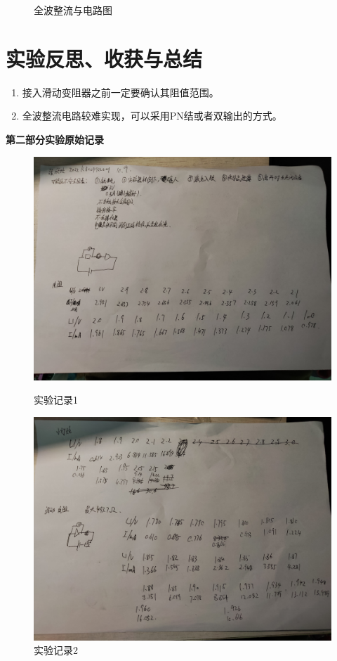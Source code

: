 \documentclass[11pt]{article}
\begin{document}
\begin{enumerate}
\begin{enumerate}
\begin{figure}[H]
            \caption{全波整流与电路图}
        \end{figure}
    \end{enumerate}
\end{enumerate}

\section{实验反思、收获与总结}
\begin{enumerate}
    \item 接入滑动变阻器之前一定要确认其阻值范围。
    \item 全波整流电路较难实现，可以采用PN结或者双输出的方式。
\end{enumerate}


\begin{center}
    \vspace*{1em}
    \Large \bf 第二部分\qquad 实验原始记录
\end{center}
\begin{figure}[H]
    \centering
    \includegraphics[width=15cm]{Fig/8.jpg}
    \caption{实验记录1}
    \vspace*{1em}
    \includegraphics[width=15cm]{Fig/9.jpg}
    \caption{实验记录2}
\end{figure}
\end{document}
